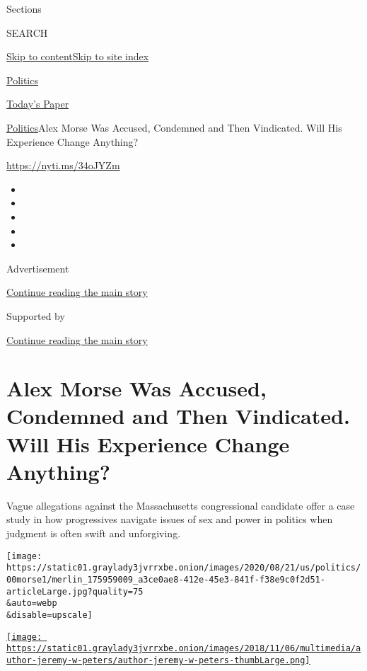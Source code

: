 Sections

SEARCH

\protect\hyperlink{site-content}{Skip to
content}\protect\hyperlink{site-index}{Skip to site index}

\href{https://www.nytimes3xbfgragh.onion/section/politics}{Politics}

\href{https://myaccount.nytimes3xbfgragh.onion/auth/login?response_type=cookie\&client_id=vi}{}

\href{https://www.nytimes3xbfgragh.onion/section/todayspaper}{Today's
Paper}

\href{/section/politics}{Politics}\textbar{}Alex Morse Was Accused,
Condemned and Then Vindicated. Will His Experience Change Anything?

\url{https://nyti.ms/34oJYZm}

\begin{itemize}
\item
\item
\item
\item
\item
\end{itemize}

Advertisement

\protect\hyperlink{after-top}{Continue reading the main story}

Supported by

\protect\hyperlink{after-sponsor}{Continue reading the main story}

\hypertarget{alex-morse-was-accused-condemned-and-then-vindicated-will-his-experience-change-anything}{%
\section{Alex Morse Was Accused, Condemned and Then Vindicated. Will His
Experience Change
Anything?}\label{alex-morse-was-accused-condemned-and-then-vindicated-will-his-experience-change-anything}}

Vague allegations against the Massachusetts congressional candidate
offer a case study in how progressives navigate issues of sex and power
in politics when judgment is often swift and unforgiving.

\texttt{[image: https://static01.graylady3jvrrxbe.onion/images/2020/08/21/us/politics/00morse1/merlin\_175959009\_a3ce0ae8-412e-45e3-841f-f38e9c0f2d51-articleLarge.jpg?quality=75\\\&auto=webp\\\&disable=upscale]}

\href{https://www.nytimes3xbfgragh.onion/by/jeremy-w-peters}{\texttt{[image: https://static01.graylady3jvrrxbe.onion/images/2018/11/06/multimedia/author-jeremy-w-peters/author-jeremy-w-peters-thumbLarge.png]}}

